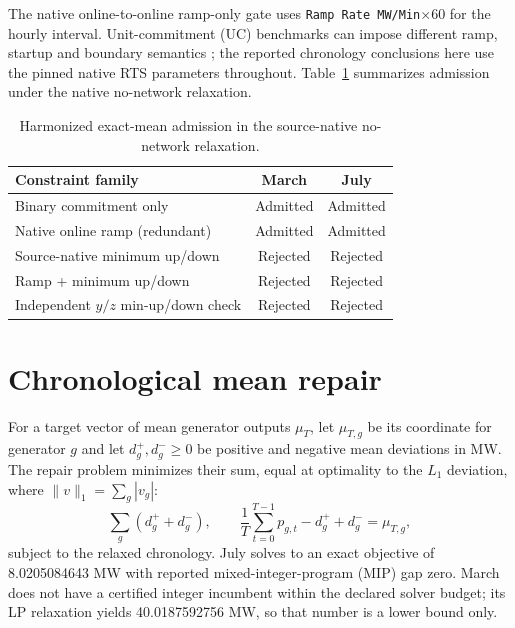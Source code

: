 \documentclass[10pt,journal,onecolumn]{IEEEtran}
\begin{document}
The native online-to-online ramp-only gate uses \texttt{Ramp Rate MW/Min}$\times60$ for the hourly interval. Unit-commitment (UC) benchmarks can impose different ramp, startup and boundary semantics \cite{PGLibUC,Knueven2020}; the reported chronology conclusions here use the pinned native RTS parameters throughout. Table~\ref{tab:supp-admission} summarizes admission under the native no-network relaxation.

\begin{table}[t]
\centering
\caption{Harmonized exact-mean admission in the source-native no-network relaxation.}
\label{tab:supp-admission}
\begin{tabular}{lcc}
\toprule
Constraint family & March & July\\
\midrule
Binary commitment only & Admitted & Admitted\\
Native online ramp (redundant) & Admitted & Admitted\\
Source-native minimum up/down & Rejected & Rejected\\
Ramp + minimum up/down & Rejected & Rejected\\
Independent $y/z$ min-up/down check & Rejected & Rejected\\
\bottomrule
\end{tabular}
\end{table}

\section{Chronological mean repair}
For a target vector of mean generator outputs $\mu_T$, let $\mu_{T,g}$ be its coordinate for generator $g$ and let $d_g^+,d_g^-\ge0$ be positive and negative mean deviations in MW. The repair problem minimizes their sum, equal at optimality to the $L_1$ deviation, where $\|v\|_1=\sum_g|v_g|$:
\begin{equation}
\sum_g(d_g^+ + d_g^-),\qquad
\frac1T\sum_{t=0}^{T-1} p_{g,t}-d_g^++d_g^-=\mu_{T,g},
\end{equation}
subject to the relaxed chronology. July solves to an exact objective of 8.0205084643 MW with reported mixed-integer-program (MIP) gap zero. March does not have a certified integer incumbent within the declared solver budget; its LP relaxation yields 40.0187592756 MW, so that number is a lower bound only.
\end{document}
